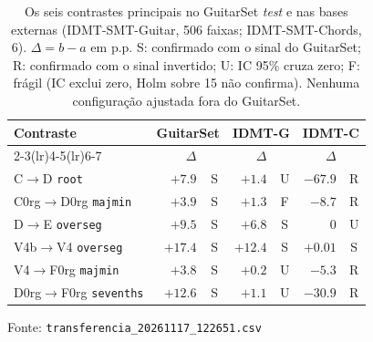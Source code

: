 \begin{table}[t]
  \centering
  \caption{Os seis contrastes principais no GuitarSet \emph{test} e nas bases externas (IDMT-SMT-Guitar, 506 faixas; IDMT-SMT-Chords, 6). $\Delta = b - a$ em p.p. S: confirmado com o sinal do GuitarSet; R: confirmado com o sinal invertido; U: IC 95\% cruza zero; F: frágil (IC exclui zero, Holm sobre 15 não confirma). Nenhuma configuração ajustada fora do GuitarSet.}
  \label{tab:transferencia_curta}
  \footnotesize
  \begin{tabular}{lrcrcrc}
    \toprule
    Contraste & \multicolumn{2}{c}{GuitarSet} & \multicolumn{2}{c}{IDMT-G} & \multicolumn{2}{c}{IDMT-C} \\
    \cmidrule(lr){2-3}\cmidrule(lr){4-5}\cmidrule(lr){6-7}
     & $\Delta$ &  & $\Delta$ &  & $\Delta$ &  \\
    \midrule
    C$\to$D \texttt{root} & $+7.9$ & S & $+1.4$ & U & $-67.9$ & R \\
    C0rg$\to$D0rg \texttt{majmin} & $+3.9$ & S & $+1.3$ & F & $-8.7$ & R \\
    D$\to$E \texttt{overseg} & $+9.5$ & S & $+6.8$ & S & $0$ & U \\
    V4b$\to$V4 \texttt{overseg} & $+17.4$ & S & $+12.4$ & S & $+0.01$ & S \\
    V4$\to$F0rg \texttt{majmin} & $+3.8$ & S & $+0.2$ & U & $-5.3$ & R \\
    D0rg$\to$F0rg \texttt{sevenths} & $+12.6$ & S & $+1.1$ & U & $-30.9$ & R \\
    \bottomrule
  \end{tabular}
  \vspace{2pt}
  \parbox{\linewidth}{\footnotesize Fonte: \texttt{transferencia\_20261117\_122651.csv}}
\end{table}
